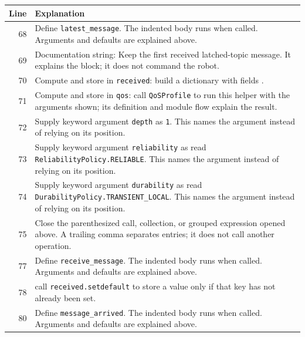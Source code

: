 \documentclass[11pt,a4paper]{book}
\begin{document}
\begin{longtable}{r p{}}

\textbf{Line} & \textbf{Explanation} \\ \hline \endhead

68 & Define \texttt{latest\_message}. The indented body runs when called. Arguments and defaults are explained above. \\

69 & Documentation string: Keep the first received latched-topic message. It explains the block; it does not command the robot. \\

70 & Compute and store in \texttt{received}: build a dictionary with fields \texttt{}.  \\

71 & Compute and store in \texttt{qos}: call \texttt{QoSProfile} to run this helper with the arguments shown; its definition and module flow explain the result.  \\

72 & Supply keyword argument \texttt{depth} as \texttt{1}. This names the argument instead of relying on its position. \\

73 & Supply keyword argument \texttt{reliability} as read \texttt{ReliabilityPolicy.RELIABLE}. This names the argument instead of relying on its position. \\

74 & Supply keyword argument \texttt{durability} as read \texttt{DurabilityPolicy.TRANSIENT\_LOCAL}. This names the argument instead of relying on its position. \\

75 & Close the parenthesized call, collection, or grouped expression opened above. A trailing comma separates entries; it does not call another operation. \\

77 & Define \texttt{receive\_message}. The indented body runs when called. Arguments and defaults are explained above. \\

78 & call \texttt{received.setdefault} to store a value only if that key has not already been set. \\

80 & Define \texttt{message\_arrived}. The indented body runs when called. Arguments and defaults are explained above. \\


\end{longtable}
\end{document}
